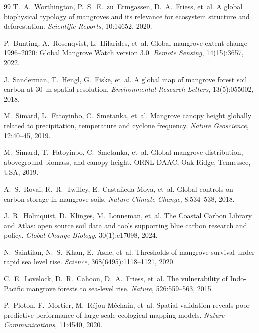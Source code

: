 \documentclass[twocolumn,9pt]{extarticle}
\begin{document}
\begin{thebibliography}{99}
T.~A.~Worthington, P.~S.~E.~zu~Ermgassen, D.~A.~Friess, et~al.
\newblock A global biophysical typology of mangroves and its relevance for ecosystem structure and deforestation.
\newblock \emph{Scientific Reports}, 10:14652, 2020.

P.~Bunting, A.~Rosenqvist, L.~Hilarides, et~al.
\newblock Global mangrove extent change 1996--2020: Global Mangrove Watch version 3.0.
\newblock \emph{Remote Sensing}, 14(15):3657, 2022.

J.~Sanderman, T.~Hengl, G.~Fiske, et~al.
\newblock A global map of mangrove forest soil carbon at 30~m spatial resolution.
\newblock \emph{Environmental Research Letters}, 13(5):055002, 2018.

M.~Simard, L.~Fatoyinbo, C.~Smetanka, et~al.
\newblock Mangrove canopy height globally related to precipitation, temperature and cyclone frequency.
\newblock \emph{Nature Geoscience}, 12:40--45, 2019.

M.~Simard, T.~Fatoyinbo, C.~Smetanka, et~al.
\newblock Global mangrove distribution, aboveground biomass, and canopy height.
\newblock ORNL DAAC, Oak Ridge, Tennessee, USA, 2019.

A.~S.~Rovai, R.~R.~Twilley, E.~Casta\~neda-Moya, et~al.
\newblock Global controls on carbon storage in mangrove soils.
\newblock \emph{Nature Climate Change}, 8:534--538, 2018.

J.~R.~Holmquist, D.~Klinges, M.~Lonneman, et~al.
\newblock The Coastal Carbon Library and Atlas: open source soil data and tools supporting blue carbon research and policy.
\newblock \emph{Global Change Biology}, 30(1):e17098, 2024.

N.~Saintilan, N.~S.~Khan, E.~Ashe, et~al.
\newblock Thresholds of mangrove survival under rapid sea level rise.
\newblock \emph{Science}, 368(6495):1118--1121, 2020.

C.~E.~Lovelock, D.~R.~Cahoon, D.~A.~Friess, et~al.
\newblock The vulnerability of Indo-Pacific mangrove forests to sea-level rise.
\newblock \emph{Nature}, 526:559--563, 2015.

P.~Ploton, F.~Mortier, M.~R\'ejou-M\'echain, et~al.
\newblock Spatial validation reveals poor predictive performance of large-scale ecological mapping models.
\newblock \emph{Nature Communications}, 11:4540, 2020.


\end{thebibliography}
\end{document}
